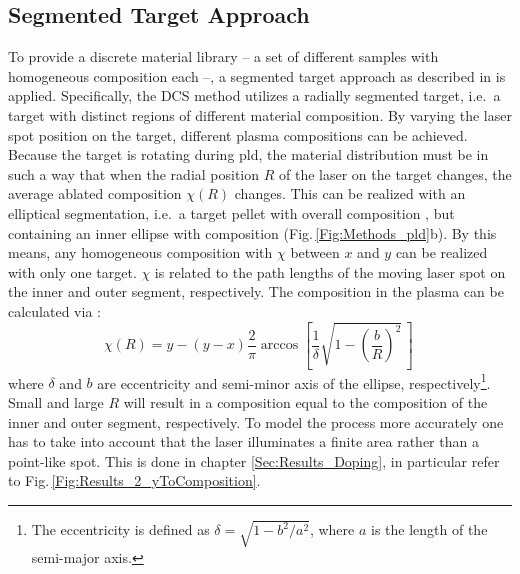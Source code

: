 \subsection{Segmented Target Approach}\label{Sec:Methods_VCCS}
To provide a discrete material library -- a set of different samples with homogeneous composition each --, a segmented target approach as described in \textcite{wenckstern2020} is applied.
Specifically, the \gls{DCS} method utilizes a radially segmented target, i.e.\ a target with distinct regions of different material composition.
By varying the laser spot position on the target, different plasma compositions can be achieved.
Because the target is rotating during \gls{pld}, the material distribution must be in such a way that when the radial position $R$ of the laser on the target changes, the average ablated composition $\chi(R)$ changes.
This can be realized with an elliptical segmentation, i.e.\ a target pellet with overall composition , but containing an inner ellipse with composition  (Fig.\,\ref{Fig:Methods_pld}b).
By this means, any homogeneous composition  with $\chi$ between $x$ and $y$ can be realized with only one target.
$\chi$ is related to the path lengths of the moving laser spot on the inner and outer segment, respectively.
The composition in the plasma can be calculated via \cite{wenckstern2020}:
\begin{equation}\label{Equ:Methods_composition}
    \chi(R) = y-(y-x)\frac{2}{\pi}\arccos\left[\frac{1}{\delta}\sqrt{1-\left(\frac{b}{R}\right)^2}\,\right]\,
\end{equation}
where $\delta$ and $b$ are eccentricity and semi-minor axis of the ellipse, respectively\footnote{
    The eccentricity is defined as $\delta=\sqrt{1-b^2/a^2}$, where $a$ is the length of the semi-major axis.
}.
Small and large $R$ will result in a composition equal to the composition of the inner and outer segment, respectively.
To model the process more accurately one has to take into account that the laser illuminates a finite area rather than a point-like spot.
This is done in chapter \ref{Sec:Results_Doping}, in particular refer to Fig.\,\ref{Fig:Results_2_yToComposition}. 